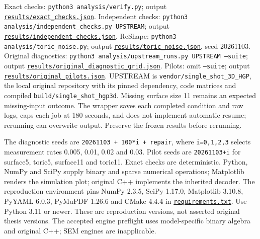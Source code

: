 \documentclass[11pt]{article}
\begin{document}
Exact checks: \texttt{python3 analysis/verify.py}; output \href{https://github.com/alectionary/vibe-math/blob/master/formalization/quintavalle-hgp/results/exact_checks.json}{\nolinkurl{results/exact_checks.json}}. Independent checks: \texttt{python3 analysis/independent\_checks.py UPSTREAM}; output \href{https://github.com/alectionary/vibe-math/blob/master/formalization/quintavalle-hgp/results/independent_checks.json}{\nolinkurl{results/independent_checks.json}}. ReShape: \texttt{python3 analysis/toric\_noise.py}; output \href{https://github.com/alectionary/vibe-math/blob/master/formalization/quintavalle-hgp/results/toric_noise.json}{\nolinkurl{results/toric_noise.json}}, seed 20261103. Original diagnostics: \texttt{python3 analysis/upstream\_runs.py UPSTREAM --suite}; output \href{https://github.com/alectionary/vibe-math/blob/master/formalization/quintavalle-hgp/results/original_diagnostic_grid.json}{\nolinkurl{results/original_diagnostic_grid.json}}. Pilots: omit \texttt{--suite}; output \href{https://github.com/alectionary/vibe-math/blob/master/formalization/quintavalle-hgp/results/original_pilots.json}{\nolinkurl{results/original_pilots.json}}. UPSTREAM is \texttt{vendor/single\_shot\_3D\_HGP}, the local original repository with its pinned dependency, code matrices and compiled \texttt{build/single\_shot\_hgp3d}. Missing surface size 11 remains an expected missing-input outcome. The wrapper saves each completed condition and raw logs, caps each job at 180 seconds, and does not implement automatic resume; rerunning can overwrite output. Preserve the frozen results before rerunning.

The diagnostic seeds are \texttt{20261103 + 100*i + repair}, where \texttt{i=0,1,2,3} selects measurement rates 0.005, 0.01, 0.02 and 0.03. Pilot seeds are \texttt{20261103+i} for surface5, toric5, surface11 and toric11. Exact checks are deterministic. Python, NumPy and SciPy supply binary and sparse numerical operations; Matplotlib renders the simulation plot; original C++ implements the inherited decoder. The reproduction environment pins NumPy 2.3.5, SciPy 1.17.0, Matplotlib 3.10.8, PyYAML 6.0.3, PyMuPDF 1.26.6 and CMake 4.4.4 in \href{https://github.com/alectionary/vibe-math/blob/master/formalization/quintavalle-hgp/requirements.txt}{\nolinkurl{requirements.txt}}. Use Python 3.11 or newer. These are reproduction versions, not asserted original thesis versions. The accepted engine preflight uses model-specific binary algebra and original C++; SEM engines are inapplicable.
\end{document}
